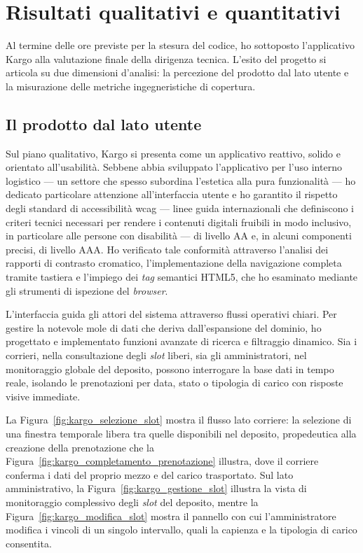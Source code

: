 \section{Risultati qualitativi e quantitativi}
\label{sec:risultati_kargo}

Al termine delle ore previste per la stesura del codice, ho sottoposto l'applicativo Kargo alla valutazione finale della dirigenza tecnica. L'esito del progetto si articola su due dimensioni d'analisi: la percezione del prodotto dal lato utente e la misurazione delle metriche ingegneristiche di copertura.

\subsection{Il prodotto dal lato utente}
\label{subsec:risultati_qualitativi}

Sul piano qualitativo, Kargo si presenta come un applicativo reattivo, solido e orientato all'usabilità. Sebbene abbia sviluppato l'applicativo per l'uso interno logistico --- un settore che spesso subordina l'estetica alla pura funzionalità --- ho dedicato particolare attenzione all'interfaccia utente e ho garantito il rispetto degli standard di accessibilità \gls{wcag} --- linee guida internazionali che definiscono i criteri tecnici necessari per rendere i contenuti digitali fruibili in modo inclusivo, in particolare alle persone con disabilità --- di livello AA e, in alcuni componenti precisi, di livello AAA. Ho verificato tale conformità attraverso l'analisi dei rapporti di contrasto cromatico, l'implementazione della navigazione completa tramite tastiera e l'impiego dei \textit{tag} semantici HTML5, che ho esaminato mediante gli strumenti di ispezione del \textit{browser}.

L'interfaccia guida gli attori del sistema attraverso flussi operativi chiari. Per gestire la notevole mole di dati che deriva dall'espansione del dominio, ho progettato e implementato funzioni avanzate di ricerca e filtraggio dinamico. Sia i corrieri, nella consultazione degli \textit{slot} liberi, sia gli amministratori, nel monitoraggio globale del deposito, possono interrogare la base dati in tempo reale, isolando le prenotazioni per data, stato o tipologia di carico con risposte visive immediate.

La Figura~\ref{fig:kargo_selezione_slot} mostra il flusso lato corriere: la selezione di una finestra temporale libera tra quelle disponibili nel deposito, propedeutica alla creazione della prenotazione che la Figura~\ref{fig:kargo_completamento_prenotazione} illustra, dove il corriere conferma i dati del proprio mezzo e del carico trasportato. Sul lato amministrativo, la Figura~\ref{fig:kargo_gestione_slot} illustra la vista di monitoraggio complessivo degli \textit{slot} del deposito, mentre la Figura~\ref{fig:kargo_modifica_slot} mostra il pannello con cui l'amministratore modifica i vincoli di un singolo intervallo, quali la capienza e la tipologia di carico consentita.

